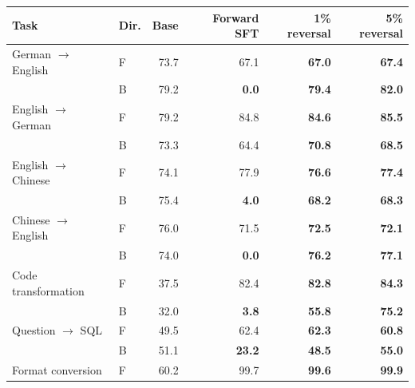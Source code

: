 \begin{table}[!t]
\centering\footnotesize
\setlength{\tabcolsep}{3pt}
\begin{tabular}{llrrrr}
\toprule
Task & Dir. & Base & Forward SFT & 1\% reversal & 5\% reversal \\
\midrule
German $\to$ English & F & 73.7 & 67.1 & \textcolor{blue!60!black}{\textbf{67.0}} & \textcolor{blue!60!black}{\textbf{67.4}} \\
 & B & 79.2 & \textcolor{red!70!black}{\textbf{0.0}} & \textcolor{blue!60!black}{\textbf{79.4}} & \textcolor{blue!60!black}{\textbf{82.0}} \\
\addlinespace[2pt]
English $\to$ German & F & 79.2 & 84.8 & \textcolor{blue!60!black}{\textbf{84.6}} & \textcolor{blue!60!black}{\textbf{85.5}} \\
 & B & 73.3 & 64.4 & \textcolor{blue!60!black}{\textbf{70.8}} & \textcolor{blue!60!black}{\textbf{68.5}} \\
\addlinespace[2pt]
English $\to$ Chinese & F & 74.1 & 77.9 & \textcolor{blue!60!black}{\textbf{76.6}} & \textcolor{blue!60!black}{\textbf{77.4}} \\
 & B & 75.4 & \textcolor{red!70!black}{\textbf{4.0}} & \textcolor{blue!60!black}{\textbf{68.2}} & \textcolor{blue!60!black}{\textbf{68.3}} \\
\addlinespace[2pt]
Chinese $\to$ English & F & 76.0 & 71.5 & \textcolor{blue!60!black}{\textbf{72.5}} & \textcolor{blue!60!black}{\textbf{72.1}} \\
 & B & 74.0 & \textcolor{red!70!black}{\textbf{0.0}} & \textcolor{blue!60!black}{\textbf{76.2}} & \textcolor{blue!60!black}{\textbf{77.1}} \\
\addlinespace[2pt]
Code transformation & F & 37.5 & 82.4 & \textcolor{blue!60!black}{\textbf{82.8}} & \textcolor{blue!60!black}{\textbf{84.3}} \\
 & B & 32.0 & \textcolor{red!70!black}{\textbf{3.8}} & \textcolor{blue!60!black}{\textbf{55.8}} & \textcolor{blue!60!black}{\textbf{75.2}} \\
\addlinespace[2pt]
Question $\to$ SQL & F & 49.5 & 62.4 & \textcolor{blue!60!black}{\textbf{62.3}} & \textcolor{blue!60!black}{\textbf{60.8}} \\
 & B & 51.1 & \textcolor{red!70!black}{\textbf{23.2}} & \textcolor{blue!60!black}{\textbf{48.5}} & \textcolor{blue!60!black}{\textbf{55.0}} \\
\addlinespace[2pt]
Format conversion & F & 60.2 & 99.7 & \textcolor{blue!60!black}{\textbf{99.6}} & \textcolor{blue!60!black}{\textbf{99.9}} \\

\end{tabular}
\end{table}

